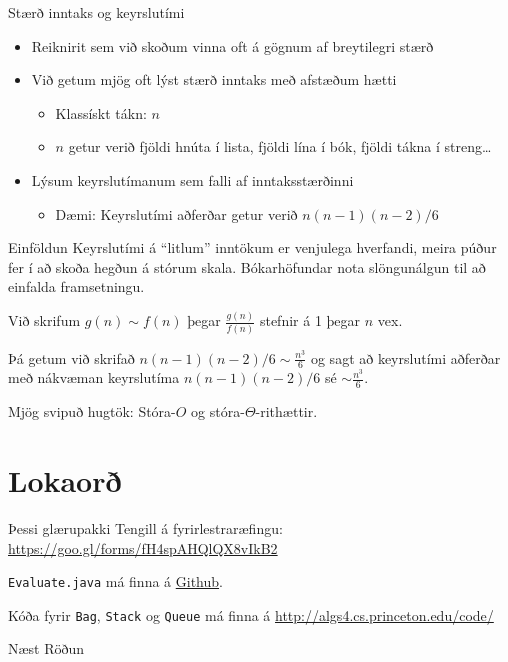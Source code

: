 \documentclass[handout]{beamer}
\begin{document}
\begin{frame}{Stærð inntaks og keyrslutími}
\begin{itemize}
 \item Reiknirit sem við skoðum vinna oft á gögnum af breytilegri stærð
 \item Við getum mjög oft lýst stærð inntaks með afstæðum hætti
 \begin{itemize}
  \item Klassískt tákn: $n$
  \item $n$ getur verið fjöldi hnúta í lista, fjöldi lína í bók, fjöldi tákna í streng\ldots
 \end{itemize}
 \item Lýsum keyrslutímanum sem falli af inntaksstærðinni
 \begin{itemize}
  \item Dæmi: Keyrslutími aðferðar getur verið $n(n-1)(n-2)/6$
 \end{itemize}
\end{itemize}
\end{frame}

\begin{frame}{Einföldun}
Keyrslutími á ``litlum'' inntökum er venjulega hverfandi, meira púður fer í að skoða hegðun á stórum skala. Bókarhöfundar nota slöngunálgun  til að einfalda framsetningu.
\begin{tcolorbox}
Við skrifum $g(n) \sim f(n)$ þegar $\frac{g(n)}{f(n)}$ stefnir á 1 þegar $n$ vex.
\end{tcolorbox}
Þá getum við skrifað $n(n-1)(n-2)/6 \sim \frac{n^3}{6}$ og sagt að keyrslutími aðferðar með nákvæman keyrslutíma $n(n-1)(n-2)/6$ sé $\sim \frac{n^3}{6}$.

\vspace{1cm}
Mjög svipuð hugtök: Stóra-$O$ og stóra-$\Theta$-rithættir.
\end{frame}

\section{Lokaorð}

\begin{frame}{Þessi glærupakki}
Tengill á fyrirlestraræfingu: \url{https://goo.gl/forms/fH4spAHQlQX8vIkB2}
\vspace{1cm}

\texttt{Evaluate.java} má finna á \href{https://github.com/Ernir/kennsluefni/tree/master/T2/Code/w4}{Github}. 

Kóða fyrir \texttt{Bag}, \texttt{Stack} og \texttt{Queue} má finna á \url{http://algs4.cs.princeton.edu/code/}
\end{frame}

\begin{frame}{Næst}
Röðun
\end{frame}
\end{document}

